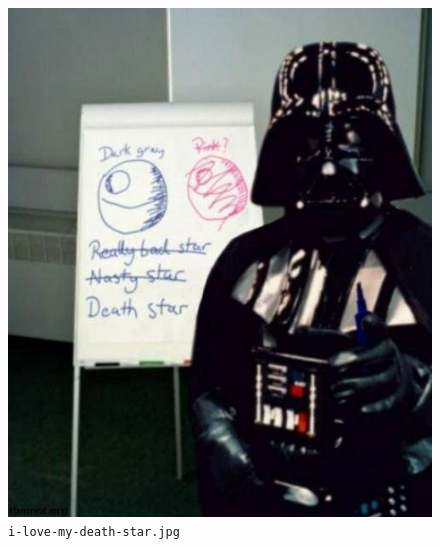 \documentclass{article}
\begin{document}
\begin{appendices}
\begin{figure}[H]
	\includegraphics[width=\linewidth]{resources/plans/i-love-my-death-star.jpg}
	\caption{\texttt{i-love-my-death-star.jpg}}
	\label{fig:i_love_my_death_star}
\end{figure}

\end{appendices}
\end{document}
